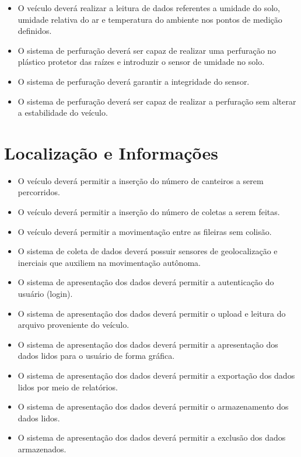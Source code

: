     \begin{itemize}
      \item O veículo deverá realizar a leitura de dados referentes a umidade do solo, umidade relativa do ar e temperatura do ambiente nos pontos de medição definidos.
      \item O sistema de perfuração deverá ser capaz de realizar uma perfuração no plástico protetor das raízes e introduzir o sensor de umidade no solo.
      \item O sistema de perfuração deverá garantir a integridade do sensor.
      \item O sistema de perfuração deverá ser capaz de realizar a perfuração sem alterar a estabilidade do veículo.
    \end{itemize}

    \section{Localização e Informações}

      \begin{itemize}
        \item O veículo deverá permitir a inserção do número de canteiros a serem percorridos.
        \item O veículo deverá permitir a inserção do número de coletas a serem feitas.
        \item O veículo deverá permitir a movimentação entre as fileiras sem colisão.
        \item O sistema de coleta de dados deverá possuir sensores de geolocalização e inerciais que auxiliem na movimentação autônoma.
        \item O sistema de apresentação dos dados deverá permitir a autenticação do usuário (login).
        \item O sistema de apresentação dos dados deverá permitir o upload e leitura do arquivo proveniente do veículo.
        \item O sistema de apresentação dos dados deverá permitir a apresentação dos dados lidos para o usuário de forma gráfica.
        \item O sistema de apresentação dos dados deverá permitir a exportação dos dados lidos por meio de relatórios.
        \item O sistema de apresentação dos dados deverá permitir o armazenamento dos dados lidos.
        \item O sistema de apresentação dos dados deverá permitir a exclusão dos dados armazenados.
      \end{itemize}
